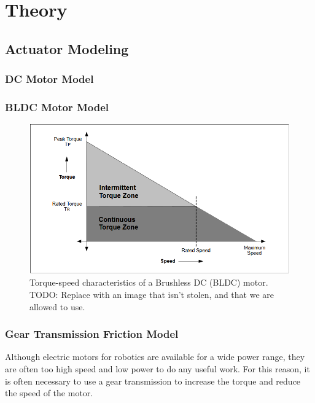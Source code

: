 \section{Theory}

\subsection{Actuator Modeling}
    \subsubsection{DC Motor Model}



    \subsubsection{BLDC Motor Model}
    \label{sec:bldc_theory}


    \begin{figure}[H]
        \centering
        \includegraphics[width=\textwidth]{Images/stolen_BLDC_torque_speed.png}
        \caption{Torque-speed characteristics of a Brushless DC (BLDC) motor. TODO: Replace with an image that isn't stolen, and that we are allowed to use. }
        \label{fig:bldc_torque_speed}
    \end{figure}

    \subsubsection{Gear Transmission Friction Model}

    Although electric motors for robotics are available for a wide power range, they are often too high speed and low power to do any useful work. For this reason, it is often necessary to use a gear transmission to increase the torque and reduce the speed of the motor. 

